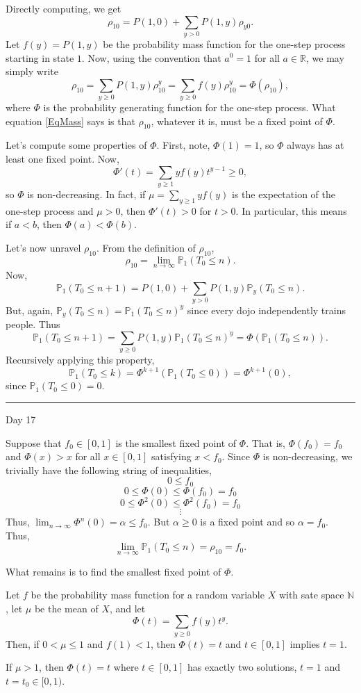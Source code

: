 \documentclass{problemset}
\newcommand{\R}{\mathbb{R}}
\newcommand{\N}{\mathbb{N}}
\newcommand{\1}{\mathbf{1}}
\renewcommand{\P}{\mathbb{P}}
\newcommand{\fatrule}[1]{\vspace{.3cm}\hrule {\hfill \sf #1}\par}
\begin{document}
	Directly computing, we get
	\[
		\rho_{10} = P(1,0)+\sum_{y> 0}P(1,y)\rho_{y0}.
	\]
	Let $f(y) = P(1,y)$ be the probability mass function for the one-step process starting in state $1$.
	Now, using the convention that $a^0=1$ for all $a\in \R$, we may simply write
	\begin{equation}
		\label{EqMass}
		\rho_{10} = \sum_{y\geq 0} P(1,y)\rho_{10}^y = \sum_{y\geq 0} f(y)\rho_{10}^y=\Phi(\rho_{10}),
	\end{equation}
	where $\Phi$ is the probability generating function for the one-step process.  What equation \eqref{EqMass}
	says is that $\rho_{10}$, whatever it is, must be a fixed point of $\Phi$.

	Let's compute some properties of $\Phi$.  First, note, $\Phi(1)=1$, so $\Phi$ always has at least one
	fixed point.  Now,
	\[
		\Phi'(t) = \sum_{y\geq 1} yf(y) t^{y-1} \geq 0,
	\]
	so $\Phi$ is non-decreasing.  In fact, if $\mu=\sum_{y\geq 1} yf(y)$ is the expectation of the one-step
	process and $\mu > 0$, then $\Phi'(t) > 0$ for $t>0$.  In particular, this means if $a<b$, then $\Phi(a)<\Phi(b)$.

	Let's now unravel $\rho_{10}$.  From the definition of $\rho_{10}$,
	\[
		\rho_{10} = \lim_{n\to\infty} \P_1(T_0\leq n).
	\]
	Now,
	\[
		\P_1(T_0\leq n+1) = P(1,0) + \sum_{y > 0} P(1,y)\P_y(T_0 \leq n).
	\]
	But, again, $\P_y(T_0 \leq n) = \P_1(T_0\leq n)^y$ since every dojo independently trains people.  Thus
	\[
		\P_1(T_0\leq n+1) = \sum_{y \geq 0} P(1,y)\P_1(T_0 \leq n)^y=\Phi(\P_1(T_0\leq n)).
	\]
	Recursively applying this property,
	\[
		\P_1(T_0\leq k) = \Phi^{k+1}(\P_1(T_0\leq 0)) = \Phi^{k+1}(0),
	\]
	since $\P_1(T_0\leq 0)=0$.

	\fatrule{Day 17}
	Suppose that $f_0\in[0,1]$ is the smallest fixed point of $\Phi$.  That is, $\Phi(f_0) = f_0$ and $\Phi(x) > x$ for all $x\in[0,1]$
	satisfying $x< f_0$.  Since $\Phi$ is non-decreasing, we trivially have the following string of inequalities,
	\[
		0  \leq f_0 
	\]\[
		0\leq \Phi(0)  \leq \Phi(f_0)=f_0 
	\]\[
		0\leq \Phi^2(0)  \leq \Phi^2(f_0)=f_0 
	\]\[
		\vdots
	\]
	Thus, $\lim_{n\to\infty} \Phi^n(0)=\alpha\leq f_0$.  But $\alpha\geq 0$ is a fixed point and so $\alpha=f_0$.  Thus,
	\[
		\lim_{n\to\infty} \P_1(T_0 \leq n) = \rho_{10} = f_0.
	\]

	What remains is to find the smallest fixed point of $\Phi$.

	\begin{theorem}
		Let $f$ be the probability mass function for a random variable $X$ with sate space $\N$, let $\mu$ be the
		mean of $X$, and let
		\[
			\Phi(t)= \sum_{y\geq 0} f(y) t^y.
		\]
		Then, if $0<\mu \leq 1$ and $f(1)<1$, then $\Phi(t)=t$ and $t\in[0,1]$ implies $t=1$.

		If $\mu > 1$, then $\Phi(t)=t$ where $t\in[0,1]$ has exactly two solutions, $t=1$ and
		$t=t_0\in[0,1)$.
	\end{theorem}
\end{document}
